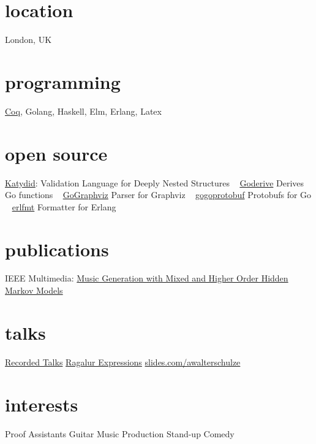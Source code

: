 \documentclass[print]{friggeri-cv-a4} %
\begin{document}

\begin{aside} %
\section{location}
London, UK
\section{programming}
\href{https://coq.inria.fr/}{Coq}, Golang, Haskell, Elm, Erlang, Latex
\section{open source}
\href{https://github.com/katydid/katydid}{Katydid}:
Validation Language for Deeply Nested Structures
~
\href{https://github.com/awalterschulze/goderive}{Goderive} 
Derives Go functions
~
\href{https://github.com/awalterschulze/gographviz}{GoGraphviz} 
Parser for Graphviz
~
\href{https://github.com/gogo/protobuf}{gogoprotobuf} 
Protobufs for Go 
~
\href{https://github.com/WhatsApp/erlfmt}{erlfmt}  
Formatter for Erlang
\section{publications}
IEEE Multimedia: \href{http://doi.ieeecomputersociety.org/10.1109/MMUL.2010.44}{Music Generation with Mixed and Higher Order Hidden Markov Models}
\section{talks}
\href{https://www.youtube.com/watch?v=qFYByoGFIUE&list=PLYwF9EIrl42T3ml_ANaNifOuTQtLxaZgQ}{\faYoutubePlay Recorded Talks}
\href{https://www.youtube.com/playlist?list=PLYwF9EIrl42S9ldgii7kfBEIHPle7PqMk}{\faYoutubePlay Ragalur Expressions} 
\href{https://slides.com/awalterschulze}{slides.com/awalterschulze}
\section{interests}
Proof Assistants
Guitar
Music Production
Stand-up Comedy
\end{aside}
\end{document}
